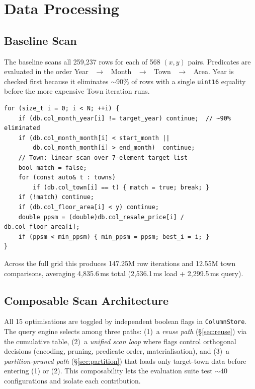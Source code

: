 \documentclass[11pt,a4paper]{article}
\begin{document}
\section{Data Processing}\label{sec:processing}

\subsection{Baseline Scan}\label{sec:baseline}
The baseline scans all 259,237 rows for each of 568 $(x,y)$ pairs.
Predicates are evaluated in the order Year ~$\to$~ Month ~$\to$~ Town ~$\to$~ Area.
Year is checked first because it eliminates ${\sim}90\%$ of rows with a single \texttt{uint16} equality before the more expensive Town iteration runs.

\begin{lstlisting}[caption={Baseline scan loop in \texttt{runQuery} (simplified).}]
for (size_t i = 0; i < N; ++i) {
    if (db.col_month_year[i] != target_year) continue;  // ~90% eliminated
    if (db.col_month_month[i] < start_month ||
        db.col_month_month[i] > end_month)  continue;
    // Town: linear scan over 7-element target list
    bool match = false;
    for (const auto& t : towns)
        if (db.col_town[i] == t) { match = true; break; }
    if (!match) continue;
    if (db.col_floor_area[i] < y) continue;
    double ppsm = (double)db.col_resale_price[i] / db.col_floor_area[i];
    if (ppsm < min_ppsm) { min_ppsm = ppsm; best_i = i; }
}
\end{lstlisting}

Across the full grid this produces 147.25M row iterations and 12.55M town comparisons, averaging 4,835.6\,ms total (2,536.1\,ms load + 2,299.5\,ms query).

\subsection{Composable Scan Architecture}\label{sec:compose}

All 15 optimisations are toggled by independent boolean flags in \texttt{ColumnStore}.
The query engine selects among three paths: (1)~a \emph{reuse path} (\S\ref{sec:reuse}) via the cumulative table, (2)~a \emph{unified scan loop} where flags control orthogonal decisions (encoding, pruning, predicate order, materialisation), and (3)~a \emph{partition-pruned path} (\S\ref{sec:partition}) that loads only target-town data before entering (1) or (2).
This composability lets the evaluation suite test ${\sim}40$ configurations and isolate each contribution.
\end{document}

